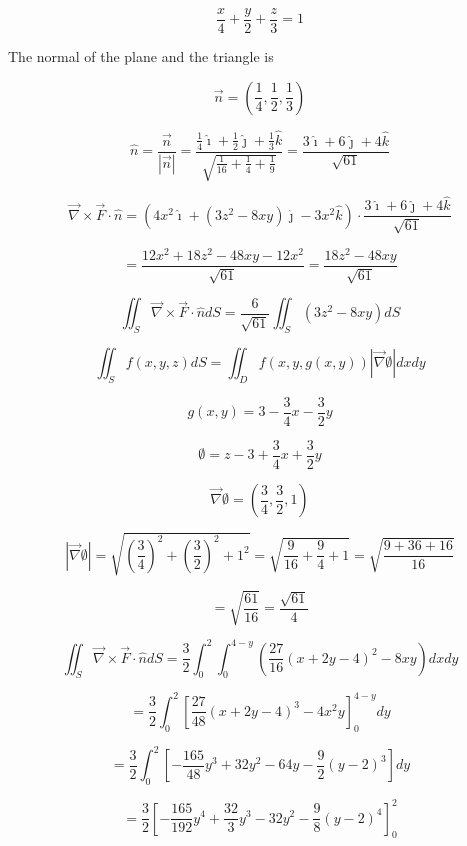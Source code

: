 \documentclass[12pt]{article}
\begin{document}
\[
    \frac{x}{4} + \frac{y}{2} + \frac{z}{3} = 1
\]

The normal of the plane and the triangle is

\[
    \vec{n} = \left( \frac{1}{4}, \frac{1}{2}, \frac{1}{3} \right)
\]

\[
    \hat{n} = \frac{\vec{n}}{\left| \vec{n} \right|}
    = \frac{\frac{1}{4} \hat{\imath} + \frac{1}{2} \hat{\jmath} + \frac{1}{3} \hat{k}}{\sqrt{\frac{1}{16} + \frac{1}{4} + \frac{1}{9}}}
    = \frac{3 \hat{\imath} + 6 \hat{\jmath} + 4 \hat{k}}{\sqrt{61}}
\]

\[
    \vec{\nabla} \times \vec{F} \cdot \hat{n}
    = \left(
    4 x^2 \hat{\imath}
    + \left(3 z^2 - 8 x y\right) \hat{\jmath}
    - 3 x^2 \hat{k}
    \right) \cdot
    \frac{3 \hat{\imath} + 6 \hat{\jmath} + 4 \hat{k}}{\sqrt{61}}
\]

\[
    = \frac{12 x^2 + 18 z^2 - 48 x y - 12 x^2}{\sqrt{61}}
    = \frac{18 z^2 - 48 x y}{\sqrt{61}}
\]

\[
    \iint_S \vec{\nabla} \times \vec{F} \cdot \hat{n} d S
    = \frac{6}{\sqrt{61}} \iint_S \left(3 z^2 - 8 x y\right)  d S
\]

\[
    \iint_S f(x, y, z) d S= \iint_D f(x, y, g(x, y))|\vec{\nabla} \emptyset| d x d y
\]

\[
    g(x, y) = 3 - \frac{3}{4} x - \frac{3}{2} y
\]

\[
    \emptyset = z - 3 + \frac{3}{4} x + \frac{3}{2} y
\]

\[
    \vec{\nabla} \emptyset = \left( \frac{3}{4}, \frac{3}{2}, 1 \right)
\]

\[
    |\vec{\nabla} \emptyset| = \sqrt{{\left( \frac{3}{4} \right)}^2 + {\left( \frac{3}{2} \right)}^2 + 1^2}
    = \sqrt{\frac{9}{16} + \frac{9}{4} + 1}
    = \sqrt{\frac{9 + 36 + 16}{16}}
\]

\[
    = \sqrt{\frac{61}{16}}
    = \frac{\sqrt{61}}{4}
\]

\[
    \iint_S \vec{\nabla} \times \vec{F} \cdot \hat{n} d S
    = \frac{3}{2} \int_0^2 \int_0^{4-y} \left(\frac{27}{16} {\left(x + 2y - 4\right)}^2 - 8 x y\right)  dx dy
\]


\[
    = \frac{3}{2} \int_0^2 {\left[\frac{27}{48} {\left(x + 2y - 4\right)}^3 - 4 x^2 y\right]}_0^{4-y} dy
\]

\[
    = \frac{3}{2} \int_0^2 \left[-\frac{165}{48} y^3 + 32 y^2 - 64 y - \frac{9}{2} {\left(y - 2\right)}^3\right] dy
\]

\[
    = \frac{3}{2} {\left[ -\frac{165}{192} y^4 + \frac{32}{3} y^3 - 32 y^2 - \frac{9}{8} {\left(y - 2\right)}^4 \right]}_0^2
\]
\end{document}
